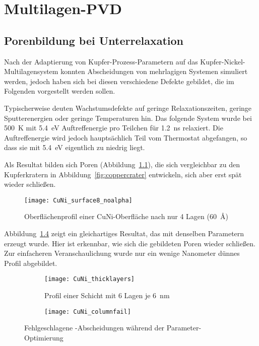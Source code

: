 \chapter{Multilagen-PVD}
\label{appendix:multilayer}

\section{Porenbildung bei Unterrelaxation}

Nach der Adaptierung von Kupfer-Prozess-Parametern auf das Kupfer-Nickel-Multilagensystem konnten Abscheidungen von mehrlagigen Systemen simuliert werden, jedoch haben sich bei diesen verschiedene Defekte gebildet, die im Folgenden vorgestellt werden sollen.

Typischerweise deuten Wachstumsdefekte auf geringe Relaxationszeiten, geringe Sputterenergien oder geringe Temperaturen hin.
Das folgende System wurde bei \SI{500}{\kelvin} mit \SI{5.4}{\electronvolt} Auftreffenergie pro Teilchen für \SI{1.2}{\nano\second} relaxiert.
Die Auftreffenergie wird jedoch hauptsächlich Teil vom Thermostat abgefangen, so dass sie mit \SI{5.4}{\electronvolt} eigentlich zu niedrig liegt.

Als Resultat bilden sich Poren (Abbildung~\ref{fig:multilayer_surfacefail}), die sich vergleichbar zu den Kupferkratern in Abbildung~\ref{fig:coppercrater} entwickeln, sich aber erst spät wieder schließen.

\begin{figure}[!ht]
  \centering
  \texttt{[image: CuNi\_surface8\_noalpha]}
  \caption{Oberflächenprofil einer CuNi-Oberfläche nach nur 4 Lagen (\SI{60}{\angstrom})}
  \label{fig:multilayer_surfacefail}
\end{figure}

\clearpage
Abbildung~\ref{fig:multilayer_columnfail} zeigt ein gleichartiges Resultat, das mit denselben Parametern erzeugt wurde.
Hier ist erkennbar, wie sich die gebildeten Poren wieder schließen.
Zur einfacheren Veranschaulichung wurde nur ein wenige Nanometer dünnes Profil abgebildet.

\begin{figure}[!ht]
  \captionsetup[subfigure]{singlelinecheck=false}
  \def\subfigwidth{7cm}
  \begin{subfigure}[t]{\subfigwidth}
    \texttt{[image: CuNi\_thicklayers]}
    \caption{Profil einer Schicht mit 6 Lagen je \SI{6}{\nano\meter}}
    \label{fig:multilayer_thickfail}
  \end{subfigure}
  \hfill
  \begin{subfigure}[t]{\subfigwidth}
    \texttt{[image: CuNi\_columnfail]}
    \label{fig:multilayer_columnfail}
  \end{subfigure}
  \caption{Fehlgeschlagene -Abscheidungen während der Parameter-Optimierung}
\end{figure}

